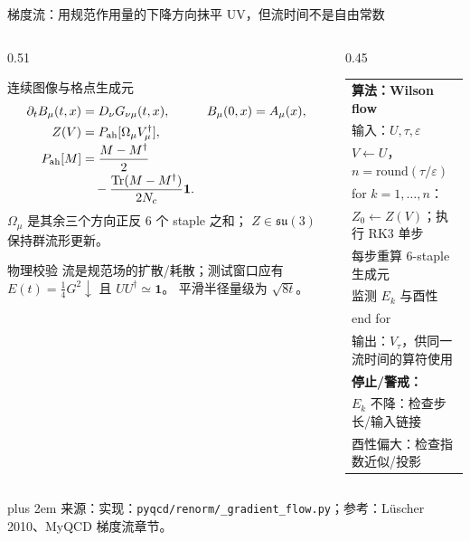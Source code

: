 \documentclass[UTF8,aspectratio=169,11pt]{ctexbeamer}
\newcommand{\source}[1]{%
  \par\vspace{0.02em}\begingroup\fontsize{6}{6.8}\selectfont\raggedright\sloppy
  \setlength{\emergencystretch}{3em}\rightskip=0pt plus 2em
  \color{muted}来源：#1\par\endgroup}
\newcommand{\Tr}{\operatorname{Tr}}
\begin{document}
\begin{frame}[t]{梯度流：用规范作用量的下降方向抹平 UV，但流时间不是自由常数}
  \begin{columns}[T,totalwidth=\textwidth]
    \begin{column}{0.51\textwidth}
      \footnotesize
      \begin{block}{连续图像与格点生成元}
        \begin{align*}
          \partial_t B_\mu(t,x)&=D_\nu G_{\nu\mu}(t,x),
          &B_\mu(0,x)&=A_\mu(x),\\
          Z(V)&=P_{\rm ah}[\Omega_\mu V_\mu^\dagger],\\[-0.2em]
          P_{\rm ah}[M]&=\frac{M-M^\dagger}{2}\\[-0.2em]
          &\quad-\frac{\Tr(M-M^\dagger)}{2N_c}\mathbf1.
        \end{align*}
        \(\Omega_\mu\) 是其余三个方向正反 6 个 staple 之和；
        \(Z\in\mathfrak{su}(3)\) 保持群流形更新。
      \end{block}
      \begin{block}{物理校验}
        流是规范场的扩散/耗散；测试窗口应有
        \(E(t)=\frac14G^2\downarrow\) 且 \(UU^\dagger\simeq\mathbf1\)。
        平滑半径量级为 \(\sqrt{8t}\)。
      \end{block}
    \end{column}
    \begin{column}{0.45\textwidth}
      \scriptsize
      \begin{tabularx}{0.94\linewidth}{@{}X@{}}
        \textbf{算法：Wilson flow}\\[0.2em]
        输入：\(U,\tau,\varepsilon\)\\
        \quad \(V\gets U\)，\(n=\mathrm{round}(\tau/\varepsilon)\)\\
        for \(k=1,\ldots,n\)：\\
        \quad \(Z_0\gets Z(V)\)；执行 RK3 单步\\
        \quad 每步重算 6-staple 生成元\\
        \quad 监测 \(E_k\) 与酉性\\
        end for\\
        输出：\(V_\tau\)，供同一流时间的算符使用\\[0.3em]
        \textbf{停止/警戒：}\\
        \quad \(E_k\) 不降：检查步长/输入链接\\
        \quad 酉性偏大：检查指数近似/投影\\
      \end{tabularx}
    \end{column}
  \end{columns}
  \vspace{-0.14em}
  \source{实现：\nolinkurl{pyqcd/renorm/_gradient_flow.py}；参考：Lüscher 2010、MyQCD 梯度流章节。}
\end{frame}
\end{document}
